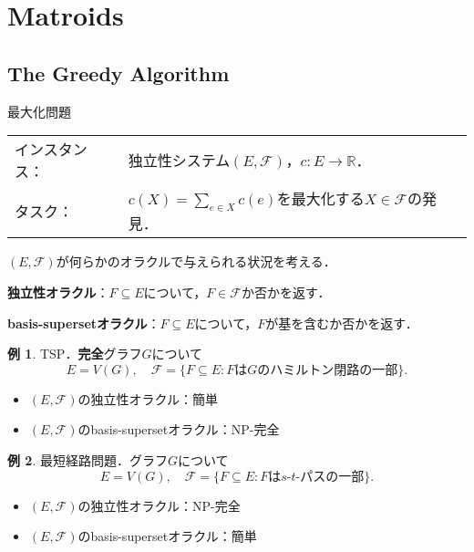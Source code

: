 \documentclass[xelatex,ja=standard,a4paper,14pt,everyparhook=compat]{bxjsarticle}
\newcommand{\bbR}{\mathbb{R}}
\newcommand{\mcF}{\mathcal{F}}
\theoremstyle{definition}
\newtheorem*{example*}{例}
\begin{document}
\setcounter{section}{12}
\section{Matroids}
\setcounter{subsection}{3}
\subsection{The Greedy Algorithm}

\begin{itembox}[l]{最大化問題}
    \begin{tabular}{ll}
        インスタンス： & 独立性システム$(E, \mcF)$，$c: E \to \bbR$．                 \\
        タスク：       & $c(X) = \sum_{e \in X} c(e)$を最大化する$X \in \mcF$の発見．
    \end{tabular}
\end{itembox}

$(E, \mcF)$が何らかのオラクルで与えられる状況を考える．

\textbf{独立性オラクル}：$F \subseteq E$について，$F \in \mcF$か否かを返す．

\textbf{basis-supersetオラクル}：$F \subseteq E$について，$F$が基を含むか否かを返す．

\begin{example*}
    TSP．\textbf{完全}グラフ$G$について \begin{equation*}
        E = V(G), \quad \mcF = \{F \subseteq E : \text{$F$は$G$のハミルトン閉路の一部}\}.
    \end{equation*}
    \begin{itemize}
        \item $(E, \mcF)$の独立性オラクル：簡単
        \item $(E, \mcF)$のbasis-supersetオラクル：NP-完全
    \end{itemize}
\end{example*}

\begin{example*}
    最短経路問題．グラフ$G$について \begin{equation*}
        E = V(G), \quad \mcF = \{F \subseteq E : \text{$F$は$s$-$t$-パスの一部}\}.
    \end{equation*}
    \begin{itemize}
        \item $(E, \mcF)$の独立性オラクル：NP-完全
        \item $(E, \mcF)$のbasis-supersetオラクル：簡単
    \end{itemize}
\end{example*}
\end{document}
